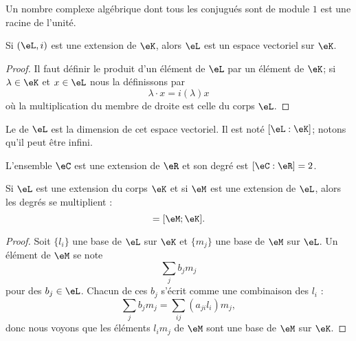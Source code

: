 \begin{lemma}
    Un nombre complexe algébrique dont tous les conjugués sont de module \( 1\) est une racine de l'unité.
\end{lemma}

\begin{lemma}       \label{LemooOLIIooXzdppM}
    Si \( (\eL,i)\) est une extension de \( \eK\), alors \( \eL\) est un espace vectoriel sur \( \eK\).
\end{lemma}

\begin{proof}
    Il faut définir le produit d'un élément de \( \eL\) par un élément de \( \eK\); si \( \lambda\in \eK\) et \( x\in \eL\) nous la définissons par
    \begin{equation}
        \lambda\cdot x=i(\lambda)x
    \end{equation}
    où la multiplication du membre de droite est celle du corps \( \eL\). 
\end{proof}

\begin{definition}      \label{DefUYiyieu}
    Le  de \( \eL\) est la dimension de cet espace vectoriel. Il est noté \( [\eL:\eK]\); notons qu'il peut être infini.
\end{definition}

\begin{example}
    L'ensemble \( \eC\) est une extension de \( \eR\) et son degré est \( [\eC:\eR]=2\).
\end{example}

\begin{proposition}     \label{PropGWazMpY}
    Si \( \eL\) est une extension du corps \( \eK\) et si \( \eM\) est une extension de \( \eL\), alors les degrés se multiplient :
    \begin{equation}
        [\eM:\eL][\eL:\eK]=[\eM;\eK].
    \end{equation}
\end{proposition}

\begin{proof}
    Soit \( \{ l_i \}\) une base de \( \eL\) sur \( \eK\) et \( \{ m_j \}\) une base de \( \eM\) sur \( \eL\). Un élément de \( \eM\) se note
    \begin{equation}
        \sum_{j}b_jm_j
    \end{equation}
    pour des \( b_j\in \eL\). Chacun de ces \( b_j\) s'écrit comme une combinaison des \( l_i\) :
    \begin{equation}
        \sum_{j}b_jm_j=\sum_{ij}(a_{ji}l_i)m_j,
    \end{equation}
    donc nous voyons que les éléments \( l_im_j\) de \( \eM\) sont une base de \( \eM\) sur \( \eK\).
\end{proof}

